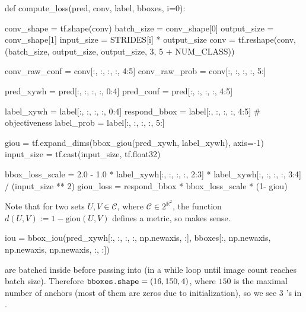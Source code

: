 \documentclass[10pt,a4paper]{article}
\begin{document}
\begin{py}
def compute_loss(pred, conv, label, bboxes, i=0):

    conv_shape  = tf.shape(conv)
    batch_size  = conv_shape[0]
    output_size = conv_shape[1]
    input_size  = STRIDES[i] * output_size
    conv = tf.reshape(conv, (batch_size, output_size, output_size, 3, 5 + NUM_CLASS))

    conv_raw_conf = conv[:, :, :, :, 4:5]
    conv_raw_prob = conv[:, :, :, :, 5:]

    pred_xywh     = pred[:, :, :, :, 0:4]
    pred_conf     = pred[:, :, :, :, 4:5]

    label_xywh    = label[:, :, :, :, 0:4]
    respond_bbox  = label[:, :, :, :, 4:5] # objectiveness
    label_prob    = label[:, :, :, :, 5:]

    giou = tf.expand_dims(bbox_giou(pred_xywh, label_xywh), axis=-1)
    input_size = tf.cast(input_size, tf.float32)

    bbox_loss_scale = 2.0 - 1.0 * label_xywh[:, :, :, :, 2:3] * label_xywh[:, :, :, :, 3:4] / (input_size ** 2)
    giou_loss = respond_bbox * bbox_loss_scale * (1- giou)
\end{py}
Note that for two sets $U,V\in \mathcal C$, where $\mathcal C\in 2^{\mathbb R^2}$, the function $d(U,V) := 1-\text{giou}(U,V)$ defines a metric, so  makes sense.
\begin{py}
    iou = bbox_iou(pred_xywh[:, :, :, :, np.newaxis, :], bboxes[:, np.newaxis, np.newaxis, np.newaxis, :, :])
\end{py}
 are batched inside  before passing into  (in a while loop until image count reaches batch size). Therefore $\code{bboxes.shape} = (16, 150, 4)$, where $150$ is the maximal number of anchors (most of them are zeros due to initialization), so we see 3 \code{:}'s in . 
\end{document}
